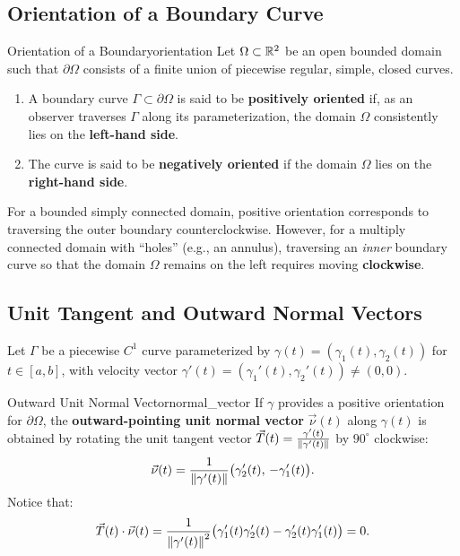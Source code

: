 \subsection{Orientation of a Boundary Curve}

\begin{definition}{Orientation of a Boundary}{orientation}
Let $\Omega \subset \mathbb{R}^2$ be an open bounded domain such that $\partial\Omega$ consists of a finite union of piecewise regular, simple, closed curves. 
\begin{enumerate}
    \item A boundary curve $\Gamma \subset \partial\Omega$ is said to be \textbf{positively oriented} if, as an observer traverses $\Gamma$ along its parameterization, the domain $\Omega$ consistently lies on the \textbf{left-hand side}.
    \item The curve is said to be \textbf{negatively oriented} if the domain $\Omega$ lies on the \textbf{right-hand side}.
\end{enumerate}
\end{definition}

\begin{remarque}
For a bounded simply connected domain, positive orientation corresponds to traversing the outer boundary counterclockwise. However, for a multiply connected domain with ``holes'' (e.g., an annulus), traversing an \emph{inner} boundary curve so that the domain $\Omega$ remains on the left requires moving \textbf{clockwise}.
\end{remarque}

\subsection{Unit Tangent and Outward Normal Vectors}

Let $\Gamma$ be a piecewise $C^1$ curve parameterized by $\gamma(t) = (\gamma_1(t), \gamma_2(t))$ for $t \in [a, b]$, with velocity vector $\gamma'(t) = (\gamma_1'(t), \gamma_2'(t)) \neq (0,0)$.

\begin{definition}{Outward Unit Normal Vector}{normal_vector}
If $\gamma$ provides a positive orientation for $\partial\Omega$, the \textbf{outward-pointing unit normal vector} $\vec{\nu}(t)$ along $\gamma(t)$ is obtained by rotating the unit tangent vector $\vec{T}(t) = \frac{\gamma'(t)}{\left\lVert\gamma'(t)\right\rVert}$ by $90^\circ$ clockwise:
\[\vec{\nu}(t) = \frac{1}{\left\lVert\gamma'(t)\right\rVert} \bigl( \gamma_2'(t), \, -\gamma_1'(t) \bigr).\]
Notice that:
\[\vec{T}(t) \cdot \vec{\nu}(t) = \frac{1}{\left\lVert\gamma'(t)\right\rVert^2} \bigl( \gamma_1'(t)\gamma_2'(t) - \gamma_2'(t)\gamma_1'(t) \bigr) = 0.\]
\end{definition}

